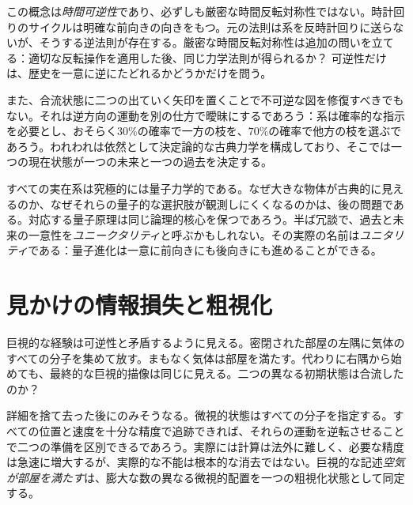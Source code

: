 この概念は\emph{時間可逆性}であり、必ずしも厳密な時間反転対称性ではない。時計回りのサイクルは明確な前向きの向きをもつ。元の法則は系を反時計回りに送らないが、そうする逆法則が存在する。厳密な時間反転対称性は追加の問いを立てる：適切な反転操作を適用した後、同じ力学法則が得られるか？ 可逆性だけは、歴史を一意に逆にたどれるかどうかだけを問う。

\begin{classroomqa}
\end{classroomqa}

また、合流状態に二つの出ていく矢印を置くことで不可逆な図を修復すべきでもない。それは逆方向の運動を別の仕方で曖昧にするであろう：系は確率的な指示を必要とし、おそらく\(30\%\)の確率で一方の枝を、\(70\%\)の確率で他方の枝を選ぶであろう。われわれは依然として決定論的な古典力学を構成しており、そこでは一つの現在状態が一つの未来と一つの過去を決定する。

すべての実在系は究極的には量子力学的である。なぜ大きな物体が古典的に見えるのか、なぜそれらの量子的な選択肢が観測しにくくなるのかは、後の問題である。対応する量子原理は同じ論理的核心を保つであろう。半ば冗談で、過去と未来の一意性を\emph{ユニークタリティ}と呼ぶかもしれない。その実際の名前は\emph{ユニタリティ}である：量子進化は一意に前向きにも後向きにも進めることができる。

\section{見かけの情報損失と粗視化}

巨視的な経験は可逆性と矛盾するように見える。密閉された部屋の左隅に気体のすべての分子を集めて放す。まもなく気体は部屋を満たす。代わりに右隅から始めても、最終的な巨視的描像は同じに見える。二つの異なる初期状態は合流したのか？

詳細を捨て去った後にのみそうなる。微視的状態はすべての分子を指定する。すべての位置と速度を十分な精度で追跡できれば、それらの運動を逆転させることで二つの準備を区別できるであろう。実際には計算は法外に難しく、必要な精度は急速に増大するが、実際的な不能は根本的な消去ではない。巨視的な記述\emph{空気が部屋を満たす}は、膨大な数の異なる微視的配置を一つの粗視化状態として同定する。

